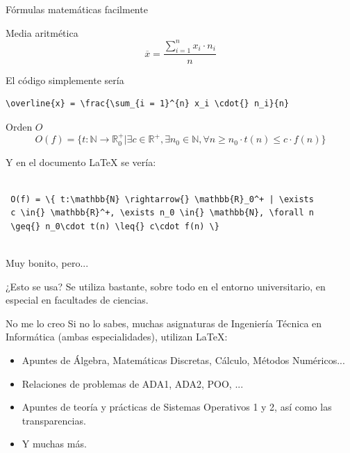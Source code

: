 \documentclass[9pt,xcolor=svgnames]{beamer}
\begin{document}
 \begin{frame}[fragile=singleslide]{Fórmulas matemáticas facilmente}
   \begin{block}{Media aritmética}
     \[
     \overline{x} = \frac{\sum_{i = 1}^{n} x_i \cdot{} n_i}{n}
    \]

     \noindent El código simplemente sería
     
     \begin{lstlisting}[style=LaTeX]
 \overline{x} = \frac{\sum_{i = 1}^{n} x_i \cdot{} n_i}{n}      
     \end{lstlisting}
      \end{block}
      
      \begin{block}{Orden $O$}
        \[
        O(f) = \{ t:\mathbb{N} \rightarrow{} \mathbb{R}_0^+ | \exists
        c \in{} \mathbb{R}^+, \exists n_0 \in{} \mathbb{N}, \forall n
        \geq{} n_0\cdot t(n) \leq{} c\cdot f(n) \}
        \]

        \noindent Y en el documento \LaTeX{} se vería:

        \begin{lstlisting}[style=LaTeX]
          
 O(f) = \{ t:\mathbb{N} \rightarrow{} \mathbb{R}_0^+ | \exists
 c \in{} \mathbb{R}^+, \exists n_0 \in{} \mathbb{N}, \forall n
 \geq{} n_0\cdot t(n) \leq{} c\cdot f(n) \}
        
        \end{lstlisting}
     
      \end{block}
      
 \end{frame}

 \begin{frame}{Muy bonito, pero...}
   \begin{block}{¿Esto se usa?}
     \noindent Se utiliza bastante, sobre todo en el entorno
     universitario, en especial en facultades de ciencias.
   \end{block}
   \pause
   \begin{block}{No me lo creo}
     \noindent Si no lo sabes, muchas asignaturas de Ingeniería
     Técnica en Informática (ambas especialidades), utilizan \LaTeX:
     \begin{itemize}
     \item Apuntes de Álgebra, Matemáticas Discretas, Cálculo, Métodos Numéricos...
     \item Relaciones de problemas de ADA1, ADA2, POO, ...
     \item Apuntes de teoría y prácticas de Sistemas Operativos 1 y 2,
       así como las transparencias.
     \item Y muchas más.
     \end{itemize}
   \end{block}
 \end{frame}
 
\end{document}
